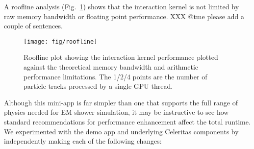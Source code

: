 \documentclass{webofc}
\begin{document}
A roofline analysis (Fig.~\ref{fig:roofline}) shows that the interaction kernel
is not limited by raw memory bandwidth or floating point performance. XXX @tme
please add a couple of sentences.

\begin{figure}[htb]
  \centering
  \texttt{[image: fig/roofline]}
  \caption{Roofline plot showing the interaction kernel performance
    plotted against the theoretical memory bandwidth and arithmetic performance
    limitations. The 1/2/4 points are the number of particle tracks processed by
    a single GPU thread.}
  \label{fig:roofline}
\end{figure}

Although this mini-app is far simpler than one that supports the full range of
physics needed for EM shower simulation, it may be instructive to see how
standard recommendations for performance enhancement affect the total runtime.
We experimented with the demo app and underlying Celeritas components by
independently making each of the following changes:
\end{document}
